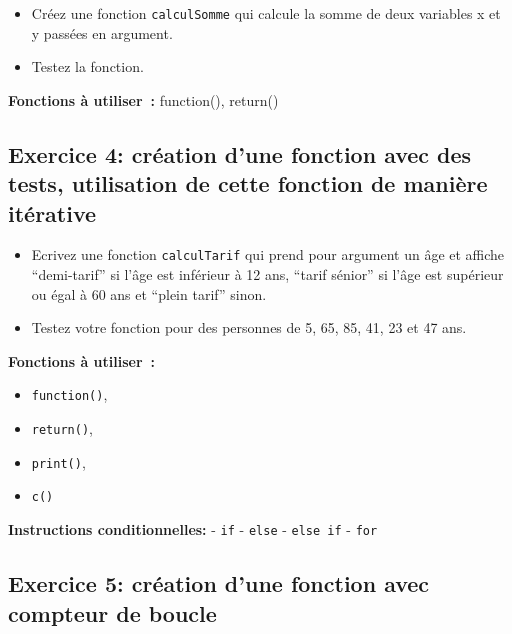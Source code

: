 \documentclass[
]{article}
\providecommand{\tightlist}{%
  \setlength{\itemsep}{0pt}\setlength{\parskip}{0pt}}
\begin{document}
\begin{itemize}
\tightlist
\item
  Créez une fonction \texttt{calculSomme} qui calcule la somme de deux
  variables x et y passées en argument.
\item
  Testez la fonction.
\end{itemize}

\textbf{Fonctions à utiliser~:} function(), return()

\hypertarget{exercice-4-cruxe9ation-dune-fonction-avec-des-tests-utilisation-de-cette-fonction-de-maniuxe8re-ituxe9rative}{%
\subsection{Exercice 4: création d'une fonction avec des tests,
utilisation de cette fonction de manière
itérative}\label{exercice-4-cruxe9ation-dune-fonction-avec-des-tests-utilisation-de-cette-fonction-de-maniuxe8re-ituxe9rative}}

\begin{itemize}
\tightlist
\item
  Ecrivez une fonction \texttt{calculTarif} qui prend pour argument un
  âge et affiche ``demi-tarif'' si l'âge est inférieur à 12 ans, ``tarif
  sénior'' si l'âge est supérieur ou égal à 60 ans et ``plein tarif''
  sinon.
\item
  Testez votre fonction pour des personnes de 5, 65, 85, 41, 23 et 47
  ans.
\end{itemize}

\textbf{Fonctions à utiliser~:}

\begin{itemize}
\tightlist
\item
  \texttt{function()},
\item
  \texttt{return()},
\item
  \texttt{print()},
\item
  \texttt{c()}
\end{itemize}

\textbf{Instructions conditionnelles: } - \texttt{if} - \texttt{else} -
\texttt{else\ if} - \texttt{for}

\hypertarget{exercice-5-cruxe9ation-dune-fonction-avec-compteur-de-boucle}{%
\subsection{Exercice 5: création d'une fonction avec compteur de
boucle}\label{exercice-5-cruxe9ation-dune-fonction-avec-compteur-de-boucle}}
\end{document}

